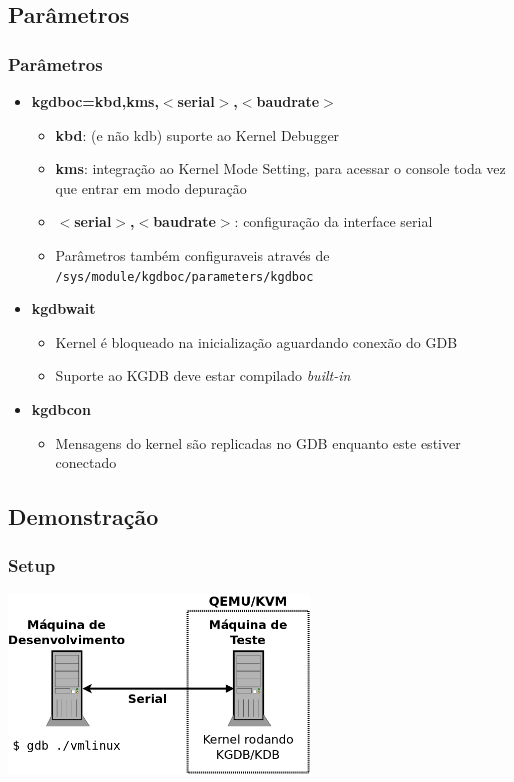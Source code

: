 \documentclass[xcolor=pdftex,dvipsnames,table]{beamer}
\newcommand{\parametro}[1]{$<$#1$>$}
\begin{document}
\subsection{Parâmetros}
\begin{frame}
       \frametitle{Parâmetros}
        \begin{center}
	\begin{itemize}
		\item \textbf{kgdboc=kbd,kms,\parametro{serial},\parametro{baudrate}}
		\begin{itemize}
			\item \textbf{kbd}: (e não kdb) suporte ao Kernel Debugger
			\item \textbf{kms}: integração ao Kernel Mode Setting, para acessar o console toda vez que entrar em modo depuração
			\item \textbf{\parametro{serial},\parametro{baudrate}}: configuração da interface serial
			\item Parâmetros também configuraveis através de \tt{/sys/module/kgdboc/parameters/kgdboc}
		\end{itemize}
		\item \textbf{kgdbwait}
		\begin{itemize}
			\item Kernel é bloqueado na inicialização aguardando conexão do GDB
			\item Suporte ao KGDB deve estar compilado \textit{built-in}
		\end{itemize}
		\item \textbf{kgdbcon}
		\begin{itemize}
			\item Mensagens do kernel são replicadas no GDB enquanto este estiver conectado
		\end{itemize}
	\end{itemize}
        \end{center}
\end{frame}

\subsection{Demonstração}
\begin{frame}
       \frametitle{Setup}
        \begin{center}
	\includegraphics[width=8cm]{images/setup.png}
        \end{center}
\end{frame}
\end{document}
